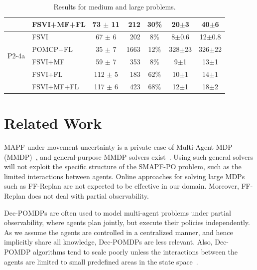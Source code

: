 \documentclass[letterpaper]{article} %
\newcommand{\itay}[1]{}
\begin{document}
\begin{table}
{\begin{tabular}{ |c|l|c|r|c|c|c| }
    & FSVI+MF+FL\itay{+} & 73 $\pm$ 11 & 212 & 30\% & 20$\pm$3 & 40$\pm$6 \\
    \hline \hline
    \multirow{4}{*}{P2-4a}
    & FSVI\itay{+} & 67 $\pm$ 6 & 202 & 8\% & 8$\pm$0.6 & 12$\pm$0.8 \\
    & POMCP+FL\itay{+} & 35 $\pm$ 7 & 1663 & 12\% & 328$\pm$23 & 326$\pm$22 \\
    & FSVI+MF\itay{+} & 59 $\pm$ 7 & 353 & 8\% & 9$\pm$1 & 13$\pm$1 \\
    &FSVI+FL\itay{+} & 112 $\pm$ 5 & 183 & 62\% & 10$\pm$1 & 14$\pm$1 \\
    & FSVI+MF+FL\itay{+} & 117 $\pm$ 6 & 423 & 68\% & 12$\pm$1 & 18$\pm$2 \\ 
    \hline
    \end{tabular}
    }
    \caption{Results for medium and large problems.}%
    \vspace{-0.3cm}
    \label{tab:large-results}
\end{table}



\section{Related Work}

MAPF under movement uncertainty is a private case of Multi-Agent MDP (MMDP)~\cite{boutilier1996planning}, and general-purpose MMDP solvers exist~\cite{de2021constrained}. Using such general solvers will not exploit the specific structure of the SMAPF-PO problem, such as the limited interactions between agents. 
Online approaches for solving large MDPs such as FF-Replan\cite{yoon2007ff} are not expected to be effective in our domain. Moreover, FF-Replan does not deal with partial observability. 


Dec-POMDPs are often used to model multi-agent problems under partial observability, where agents plan jointly, but execute their policies independently.
As we assume the agents are controlled in a centralized manner, and hence implicitly share all knowledge, Dec-POMDPs are less relevant.
Also, Dec-POMDP algorithms tend to scale poorly unless the interactions between the agents are limited to small predefined areas in the state space~\cite{melo2009learning}. 
\end{document}
